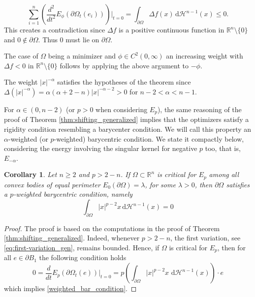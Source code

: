 \documentclass[10pt,leqno]{amsart}
\makeatletter
\newcommand{\R}[0]{\mathbb{R}}
\newcommand{\p}{\partial}
\newcommand{\dH}{\, \mathrm{d} \mathcal{H}^{n-1}}
\numberwithin{Theorem}{section}
\newtheorem{Corollary}[Theorem]{Corollary}
\theoremstyle{definition}
\theoremstyle{remark}
\numberwithin{equation}{section}
\numberwithin{equation}{section}
\newenvironment{customproof}[1]{%
  \par\pushQED{\qed}%
  \normalfont\topsep6pt \trivlist
  \item[\hskip\labelsep\itshape
    Proof of #1\@addpunct{.}]\ignorespaces
}{%
  \popQED\endtrivlist\@endpefalse
}
\makeatother
\begin{document}
\begin{customproof}{Theorem \ref{thm:shifting_generalized}}
\[
\sum_{i=1}^{n} \left(\frac{d^2}{d t^2} E_{\phi}(\p \Omega_t(e_i)) \right)\!\Big|_{t=0} = \int_{\p \Omega} \Delta f(x)\dH(x) \leq 0.
\] 
This creates a contradiction since $\Delta f$ is a positive continuous function in $\R^n \setminus \{0 \}$ and $0 \notin \p \Omega$. Thus $0$ must lie on $\p \Omega$.

The case of  $\Omega$  being a minimizer and $\phi\in C^2(0,\infty)$ an increasing weight  with $\Delta f<0$ in $\R^n \setminus \{ 0\}$ follows by applying the above argument to $-\phi$.

The weight $|x|^{-\alpha}$ satisfies the hypotheses of the theorem since $\Delta \left( |x|^{-\alpha}\right) = \alpha(\alpha+2-n)|x|^{-\alpha-2} > 0$ for $n-2 < \alpha < n-1$.
\end{customproof}




For $\alpha \in (0,n-2)$ (or $p>0$ when considering $E_{p}$), the same reasoning of the proof of Theorem \ref{thm:shifting_generalized} implies that the optimizers satisfy a rigidity condition resembling a barycenter condition. We will call this property an $\alpha$-weighted (or $p$-weighted) barycentric condition. We state it compactly below, considering the energy involving the singular kernel for negative $p$ too, that is, $E_{-\alpha}$.


\begin{Corollary} \label{cor:weighted_barycenter}
    Let $n\geq 2$ and  $p>2-n$. If $\Omega \subset \R^n$ is critical for $E_{p}$ among all convex bodies  of equal perimeter $E_0( \p \Omega)=\lambda$, for some $\lambda>0$,  then $\p \Omega$ satisfies a $p$-weighted barycentric condition, namely
\begin{equation} \label{weighted_bar_condition}
    \int_{\p \Omega} |x|^{p-2}x \dH(x) = 0
\end{equation}
\end{Corollary}
\begin{proof}
The proof is based on the computations in the proof of Theorem \ref{thm:shifting_generalized}. Indeed, whenever $p > 2-n$, the first variation, see \eqref{eq:first-variation_gen}, remains bounded. Hence, if $\Omega$ is critical for $E_{p}$, then for all $e \in \p B_1$  the following condition holds
\[
0=\frac{d}{d t} E_{p}(\p \Omega_t(e)) \Big|_{t=0} = p  \left( \int_{\p \Omega} |x|^{p-2}  x \,  \dH(x)  \right) \cdot e
\]
which implies \eqref{weighted_bar_condition}.
\end{proof}
\end{document}

